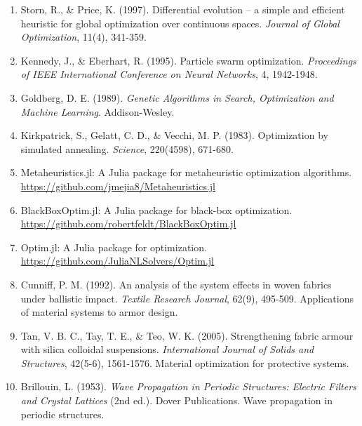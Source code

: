 \documentclass[11pt,a4paper]{article}
\begin{document}
\begin{enumerate}
    \item \label{ref:storn1997} Storn, R., \& Price, K. (1997). Differential evolution – a simple and efficient heuristic for global optimization over continuous spaces. \textit{Journal of Global Optimization}, 11(4), 341-359.
    
    \item \label{ref:kennedy1995} Kennedy, J., \& Eberhart, R. (1995). Particle swarm optimization. \textit{Proceedings of IEEE International Conference on Neural Networks}, 4, 1942-1948.
    
    \item \label{ref:goldberg1989} Goldberg, D. E. (1989). \textit{Genetic Algorithms in Search, Optimization and Machine Learning}. Addison-Wesley.
    
    \item \label{ref:kirkpatrick1983} Kirkpatrick, S., Gelatt, C. D., \& Vecchi, M. P. (1983). Optimization by simulated annealing. \textit{Science}, 220(4598), 671-680.
    
    \item \label{ref:metaheuristics} Metaheuristics.jl: A Julia package for metaheuristic optimization algorithms. \url{https://github.com/jmejia8/Metaheuristics.jl}
    
    \item \label{ref:blackboxoptim} BlackBoxOptim.jl: A Julia package for black-box optimization. \url{https://github.com/robertfeldt/BlackBoxOptim.jl}
    
    \item \label{ref:optim} Optim.jl: A Julia package for optimization. \url{https://github.com/JuliaNLSolvers/Optim.jl}
    
    \item \label{ref:armor1} Cunniff, P. M. (1992). An analysis of the system effects in woven fabrics under ballistic impact. \textit{Textile Research Journal}, 62(9), 495-509. Applications of material systems to armor design.
    
    \item \label{ref:armor2} Tan, V. B. C., Tay, T. E., \& Teo, W. K. (2005). Strengthening fabric armour with silica colloidal suspensions. \textit{International Journal of Solids and Structures}, 42(5-6), 1561-1576. Material optimization for protective systems.
    
    \item \label{ref:wave1} Brillouin, L. (1953). \textit{Wave Propagation in Periodic Structures: Electric Filters and Crystal Lattices} (2nd ed.). Dover Publications. Wave propagation in periodic structures.
    

\end{enumerate}
\end{document}
